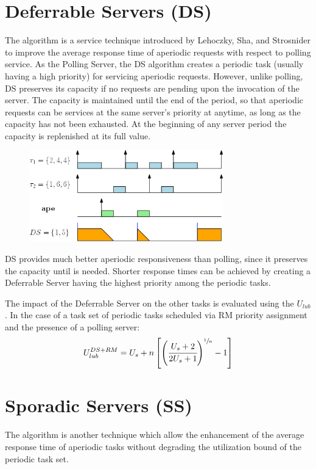 \section{Deferrable Servers (DS)}
The  algorithm is a service technique introduced by Lehoczky, Sha, and Strosnider to improve the average response time of aperiodic requests with respect to polling service. As the Polling Server, the DS algorithm creates a periodic task (usually having a high priority) for servicing aperiodic requests. However, unlike polling, DS preserves its capacity if no requests are pending upon the invocation of the server. The capacity is maintained until the end of the period, so that aperiodic requests can be services at the same server's priority at anytime, as long as the capacity has not been exhausted. At the beginning of any server period the capacity is replenished at its full value.


\begin{figure}[!h]
    \centering
    \includegraphics[width = 0.75\textwidth]{images/image05.png}
\end{figure}


DS provides much better aperiodic responsiveness than polling, since it preserves the capacity until is needed. Shorter response times can be achieved by creating a Deferrable Server having the highest priority among the periodic tasks.

The impact of the Deferrable Server on the other tasks is evaluated using the $U_{lub}$. In the case of a task set of periodic tasks scheduled via RM priority assignment and the presence of a polling server:
\[U_{lub}^{DS + RM} = U_s + n\left[\left(\cfrac{U_s+2}{2U_s+1}\right)^{\sfrac{1}{n}}-1\right]\]

\section{Sporadic Servers (SS)}

The  algorithm is another technique which allow the enhancement of the average response time of aperiodic  tasks without degrading the utilization bound of the periodic task set.

